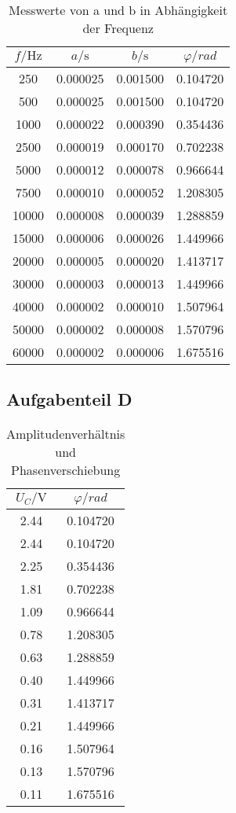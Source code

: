 \begin{table}
	\centering
	\caption{Messwerte von a und b in Abhängigkeit der Frequenz}
	\label{tab:ab}
	\begin{tabular}{c c c c}
	  \toprule
	  $f/\unit{\hertz}$ & $a/\unit{\second}$ & $b/\unit{\second}$ & $\varphi / rad$ \\
	  \midrule      
		250 & 0.000025 & 0.001500 & 0.104720 \\
		500  &0.000025 & 0.001500 & 0.104720\\
		1000 & 0.000022&  0.000390 & 0.354436\\
		2500 & 0.000019 & 0.000170&  0.702238\\
		5000&  0.000012 & 0.000078&  0.966644\\
		7500 & 0.000010 & 0.000052 & 1.208305\\
		10000 & 0.000008 & 0.000039&  1.288859\\
		15000 & 0.000006 & 0.000026 & 1.449966\\
		20000 & 0.000005 & 0.000020 & 1.413717\\
		30000 & 0.000003 & 0.000013 & 1.449966\\
		40000 & 0.000002  &0.000010 & 1.507964\\
		50000&  0.000002 & 0.000008 & 1.570796\\
		60000 & 0.000002 & 0.000006 & 1.675516\\
	  \bottomrule
	\end{tabular}
  \end{table}

\subsection{Aufgabenteil D}

\begin{table}
	\centering
	\caption{Amplitudenverhältnis und Phasenverschiebung}
	\label{tab:Uphi}
	\begin{tabular}{c c}
	  \toprule
	  $U_C/\unit{\volt}$ & $\varphi / rad$ \\
	  \midrule      
	  2.44  & 0.104720 \\
	  2.44  & 0.104720\\
	  2.25  & 0.354436\\
	  1.81  &  0.702238\\
	  1.09  &  0.966644\\
	  0.78  & 1.208305\\
	  0.63  &  1.288859\\
	  0.40  & 1.449966\\
	  0.31  & 1.413717\\
	  0.21  & 1.449966\\
	  0.16  & 1.507964\\
	  0.13  & 1.570796\\
	  0.11  & 1.675516\\
	  \bottomrule
	\end{tabular}
  \end{table}